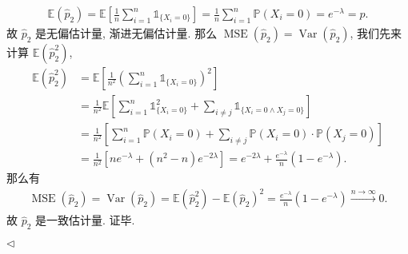 \documentclass[11pt]{article}
\newtheorem{lemma}[theorem]{Lemma}
\newenvironment{answer}[1][Solution]{\begin{trivlist}
    \item[\hskip \labelsep {\bfseries #1.}\hskip \labelsep]}{\hfill$\lhd$\end{trivlist}}
\newcommand\1{\mathds{1}}
\newcommand\R{\mathbb{R}}
\newcommand\E{\mathbb{E}}
\newcommand\N{\mathbb{N}}
\newcommand\PP{\mathbb{P}}
\newcommand{\arrp}{\xrightarrow{P}}
\newcommand{\arri}{\xrightarrow{n\rightarrow\infty}}
\DeclareMathOperator{\Var}{Var}
\DeclareMathOperator{\MSE}{MSE}
\begin{document}
\begin{answer}
\begin{enumerate}[label=(\arabic*)]
        \begin{align*}
            \E\left(\hat{p}_2\right) = \E\left[\frac{1}{n}\sum_{i=1}^{n} \1_{\{X_i = 0\}}\right] = \frac{1}{n} \sum_{i=1}^{n} \PP(X_i = 0) = e^{-\lambda} = p.
        \end{align*}
        故 $\hat{p}_2$ 是无偏估计量, 渐进无偏估计量. 那么 $\MSE(\hat{p}_2) = \Var(\hat{p}_2)$, 我们先来计算 $\E\left(\hat{p}_2^2\right)$,
        \begin{align*}
            \E\left(\hat{p}_2^2\right) &= \E\left[\frac{1}{n^2}\left(\sum_{i=1}^{n} \1_{\{X_i=0\}}\right)^2\right]  \\
            &= \frac{1}{n^2} \E\left[\sum_{i=1}^{n}\1_{\{X_i=0\}}^2 + \sum_{i\neq j} \1_{\{X_i = 0 \land X_j = 0\}}\right] \\
            &= \frac{1}{n^2} \left[\sum_{i=1}^{n}\PP(X_i = 0) + \sum_{i\neq j} \PP(X_i=0) \cdot \PP(X_j =0)\right] \\
            &= \frac{1}{n^2} \left[n e^{-\lambda} + (n^2 - n) e^{-2\lambda}\right] = e^{-2\lambda} + \frac{e^{-\lambda}}{n}(1 - e^{-\lambda}).
        \end{align*}
        那么有
        \begin{align*}
            \MSE(\hat{p}_2) = \Var(\hat{p}_2) = \E\left(\hat{p}_2^2\right) - \E\left(\hat{p}_2\right)^2 = \frac{e^{-\lambda}}{n} (1 - e^{-\lambda}) \arri 0.
        \end{align*}
        故 $\hat{p}_2$ 是一致估计量. 证毕.
    \end{enumerate}

\end{answer}
\end{document}
